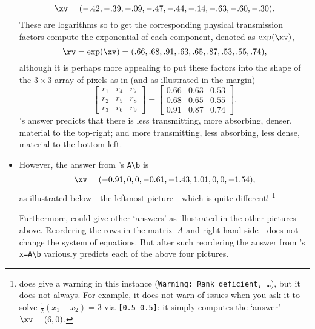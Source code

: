 \begin{example}
\begin{itemize}
\begin{equation*}
\xv=
(-.42,-.39,-.09,-.47,-.44,-.14,-.63,-.60,-.30).
\end{equation*}
These are logarithms so to get the corresponding physical transmission factors compute the exponential of each component, denoted as \(\exp(\xv)\),
\begin{equation*}
\rv=\exp(\xv)=(.66,.68,.91,.63,.65,.87,.53,.55,.74),
\end{equation*}
although it is perhaps more appealing to put these factors into the shape of the \(3\times3\) array of pixels as in (and as illustrated in the margin)
%
\begin{equation*}
\begin{bmatrix} r_1&r_4&r_7\\r_2&r_5&r_8\\r_3&r_6&r_9 \end{bmatrix}
=\begin{bmatrix} 0.66&0.63&0.53
\\0.68&0.65&0.55
\\0.91&0.87&0.74
 \end{bmatrix}.
\end{equation*}
\script[2]'s answer predicts that there is less transmitting, more absorbing, denser, material to the top-right; and more transmitting, less absorbing, less dense, material to the bottom-left.

\item 
However, the answer from \script[1]'s \verb|A\b| is \twodp
\begin{equation*}
\xv=\small(-0.91,0,0,-0.61,-1.43,1.01,0,0,-1.54),
\end{equation*}
as illustrated below---the leftmost picture---which is quite different!
\footnote{\script[1] does give a warning in this instance (\texttt{Warning: Rank deficient, \ldots}), but it does not always. 
For example, it does not warn of issues when you ask it to solve \(\frac12(x_1+x_2)=3\) via \texttt{[0.5 0.5]}: it simply computes the `answer' \(\xv=(6,0)\).}
\begin{center}
\hfil
{}
\hfil
{}
\hfil
{}
\end{center}
Furthermore, \script[1] could give other `answers' as illustrated in the other pictures above. 
Reordering the rows in the matrix~\(A\) and right-hand side~\bv\  does not change the system of equations.
But after such reordering the answer from \script[1]'s \verb|x=A\b|  variously predicts each of the above four pictures.
\end{itemize}



\end{example}
